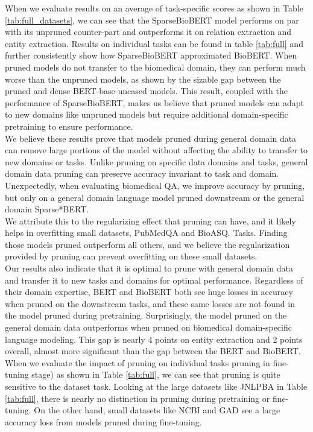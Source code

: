 When we evaluate results on an average of task-specific scores as shown in Table \ref{tab:full_datasets}, we can see that the SparseBioBERT model performs on par with its unpruned counter-part and outperforms it on relation extraction and entity extraction. Results on individual tasks can be found in table \ref{tab:full} and further consistently show how SparseBioBERT approximated BioBERT. When pruned models do not transfer to the biomedical domain, they can perform much worse than the unpruned models, as shown by the sizable gap between the pruned and dense BERT-base-uncased models. This result, coupled with the performance of SparseBioBERT, makes us believe that pruned models can adapt to new domains like unpruned models but require additional domain-specific pretraining to ensure performance. \\
We believe these results prove that models pruned during general domain data can remove large portions of the model without affecting the ability to transfer to new domains or tasks. Unlike pruning on specific data domains and tasks, general domain data pruning can preserve accuracy invariant to task and domain. \\
Unexpectedly, when evaluating biomedical QA, we improve accuracy by pruning, but only on a general domain language model pruned downstream or the general domain Sparse*BERT. \\ We attribute this to the regularizing effect that pruning can have, and it likely helps in overfitting small datasets, PubMedQA and BioASQ. Tasks. Finding those models pruned outperform all others, and we believe the regularization provided by pruning can prevent overfitting on these small datasets.  \\
Our results also indicate that it is optimal to prune with general domain data and transfer it to new tasks and domains for optimal performance. Regardless of their domain expertise, BERT and BioBERT both see huge losses in accuracy when pruned on the downstream tasks, and these same losses are not found in the model pruned during pretraining. Surprisingly, the model pruned on the general domain data outperforms when pruned on biomedical domain-specific language modeling. This gap is nearly 4 points on entity extraction and 2 points overall, almost more significant than the gap between the BERT and BioBERT. \\
When we evaluate the impact of pruning on individual tasks pruning in fine-tuning stage) as shown in Table \ref{tab:full}, we can see that pruning is quite sensitive to the dataset task. Looking at the large datasets like JNLPBA in Table \ref{tab:full}, there is nearly no distinction in pruning during pretraining or fine-tuning. On the other hand, small datasets like NCBI and GAD see a large accuracy loss from models pruned during fine-tuning.  \\
